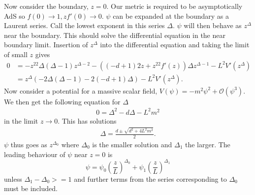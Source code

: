 \documentclass[12pt]{report}
\begin{document}
Now consider the boundary, $z=0$. Our metric is required to be asymptotically AdS so $f(0)\rightarrow1, zf'(0)\rightarrow0$. $\psi$ can be expanded at the boundary as a Laurent series. Call the lowest exponent in this series $\Delta$. $\psi$ will then behave as $z^\Delta$ near the boundary. This should solve the differential equation in the near boundary limit. Insertion of $z^\Delta$ into the differential equation and taking the limit of small $z$ gives
\begin{equation}
\begin{split}
0&=-z^22\Delta(\Delta-1)z^{\Delta-2}-\left((-d+1)2z + z^22f'(z)\right)\Delta z^{\Delta-1} -L^2V'(z^{\Delta})\\
&=z^{\Delta}\left(-2\Delta(\Delta-1)-2(-d+1)\Delta\right)-L^2V'(z^{\Delta}).
\end{split}
\end{equation}
Now consider a potential for a massive scalar field, $V(\psi)=-m^2\psi^2+\mathcal{O}(\psi^3)$. We then get the following equation for $\Delta$
\begin{equation}
\begin{split}
0=\Delta^2-d\Delta-L^2m^2
\end{split}
\end{equation}
in the limit $z\rightarrow0$. This has solutions
\begin{equation}
\begin{split}
\Delta=\frac{d\pm\sqrt{d^2+4L^2m^2}}{2}.
\end{split}
\end{equation}
$\psi$ thus goes as $z^{\Delta_0}$ where $\Delta_0$ is the smaller solution and $\Delta_1$ the larger. The leading behaviour of $\psi$ near $z=0$ is
\begin{equation}
 \psi=\psi_0\left(\frac{z}{L}\right)^{\Delta_0}+\psi_1\left(\frac{z}{L}\right)^{\Delta_1}
\end{equation}
unless $\Delta_1-\Delta_0>=1$ and further terms from the series corresponding to $\Delta_0$ must be included.\\
\end{document}
